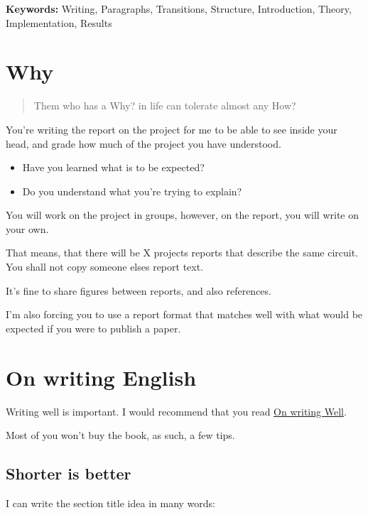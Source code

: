 \textbf{Keywords:} Writing, Paragraphs, Transitions, Structure,
Introduction, Theory, Implementation, Results

\section{Why}\label{why}

\begin{quote}
Them who has a Why? in life can tolerate almost any How?
\end{quote}

You're writing the report on the project for me to be able to see inside
your head, and grade how much of the project you have understood.

\begin{itemize}
\tightlist
\item
  Have you learned what is to be expected?
\item
  Do you understand what you're trying to explain?
\end{itemize}

You will work on the project in groups, however, on the report, you will
write on your own.

That means, that there will be X projects reports that describe the same
circuit. You shall not copy someone elses report text.

It's fine to share figures between reports, and also references.

I'm also forcing you to use a report format that matches well with what
would be expected if you were to publish a paper.

\section{On writing English}\label{on-writing-english}

Writing well is important. I would recommend that you read
\href{https://www.amazon.com/Writing-Well-Classic-Guide-Nonfiction/dp/0060891548}{On
writing Well}.

Most of you won't buy the book, as such, a few tips.

\subsection{Shorter is better}\label{shorter-is-better}

I can write the section title idea in many words:

